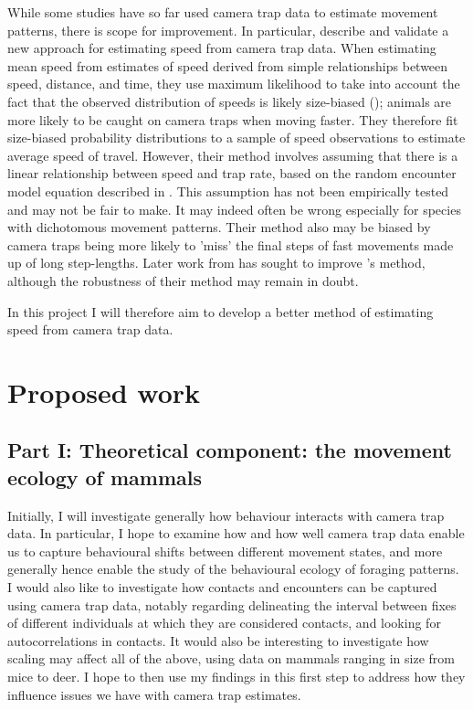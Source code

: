 \documentclass[11pt]{article}
\begin{document}
	While some studies have so far used camera trap data to estimate movement patterns, there is scope for improvement. In particular, \cite{rowcliffe2016wildlife} describe and validate a new approach for estimating speed from camera trap data. When estimating mean speed from estimates of speed derived from simple relationships between speed, distance, and time, they use maximum likelihood to take into account the fact that the observed distribution of speeds is likely size-biased (\cite{patil2006weighted}); animals are more likely to be caught on camera traps when moving faster. They therefore fit size-biased probability distributions to a sample of speed observations to estimate average speed of travel. However, their method involves assuming that there is a linear relationship between speed and trap rate, based on the random encounter model equation described in \cite{rowcliffe2008estimating}. This assumption has not been empirically tested and may not be fair to make. It may indeed often be wrong especially for species with dichotomous movement patterns. Their method also may be biased by camera traps being more likely to 'miss' the final steps of fast movements made up of long step-lengths. Later work from \cite{palencia2021innovations} has sought to improve \cite{rowcliffe2016wildlife}'s method, although the robustness of their method may remain in doubt.
	
	In this project I will therefore aim to develop a better method of estimating speed from camera trap data.
	
	\newpage
	\section{Proposed work}
	
	\subsection{Part I: Theoretical component: the movement ecology of mammals}
	
	Initially, I will investigate generally how behaviour interacts with camera trap data. In particular, I hope to examine how and how well camera trap data enable us to capture behavioural shifts between different movement states, and more generally hence enable the study of the behavioural ecology of foraging patterns. I would also like to investigate how contacts and encounters can be captured using camera trap data, notably regarding delineating the interval between fixes of different individuals at which they are considered contacts, and looking for autocorrelations in contacts. It would also be interesting to investigate how scaling may affect all of the above, using data on mammals ranging in size from mice to deer. 
	I hope to then use my findings in this first step to address how they influence issues we have with camera trap estimates.
	
\end{document}

